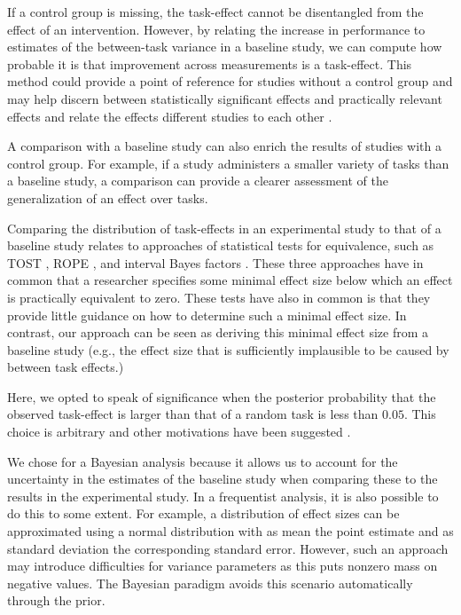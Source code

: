 \documentclass[man, floatsintext]{apa7}
\begin{document}
If a control group is missing, the task-effect cannot be disentangled from the effect of an intervention.
However, by relating the increase in performance to estimates of the between-task variance in a baseline study, we can compute how probable it is that improvement across measurements is a task-effect.
This method could provide a point of reference for studies without a control group and may help discern between statistically significant effects and practically relevant effects and relate the effects different studies to each other \parencite{fan2001statistical, hojat2004visitor}.


A comparison with a baseline study can also enrich the results of studies with a control group.
For example, if a study administers a smaller variety of tasks than a baseline study, a comparison can provide a clearer assessment of the generalization of an effect over tasks.

Comparing the distribution of task-effects in an experimental study to that of a baseline study relates to approaches of statistical tests for equivalence, such as TOST \parencite{lakens2017equivalence}, ROPE \parencite{kruschke2011bayesian}, and interval Bayes factors \parencite{MoreyRouder2011}.
These three approaches have in common that a researcher specifies some minimal effect size below which an effect is practically equivalent to zero.
These tests have also in common is that they provide little guidance on how to determine such a minimal effect size.
In contrast, our approach can be seen as deriving this minimal effect size from a baseline study (e.g., the effect size that is sufficiently implausible to be caused by between task effects.)

Here, we opted to speak of significance when the posterior probability that the observed task-effect is larger than that of a random task is less than $0.05$. This choice is arbitrary and other motivations have been suggested \parencite{McShane2017abandon, BenjaminEtAl2018}.

We chose for a Bayesian analysis because it allows us to account for the uncertainty in the estimates of the baseline study when comparing these to the results in the experimental study.
In a frequentist analysis, it is also possible to do this to some extent.
For example, a distribution of effect sizes can be approximated using a normal distribution with as mean the point estimate and as standard deviation the corresponding standard error.
However, such an approach may introduce difficulties for variance parameters as this puts nonzero mass on negative values.
The Bayesian paradigm avoids this scenario automatically through the prior.
\end{document}
